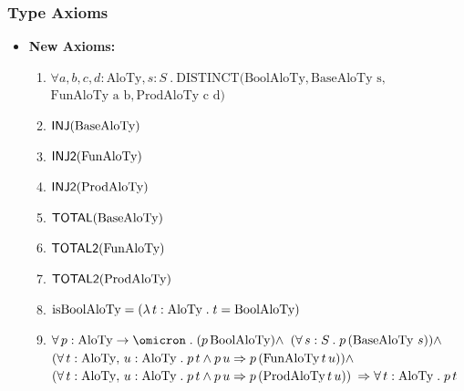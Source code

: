 \documentclass[xcolor={dvipsnames}]{beamer}
\newcommand{\cInjB}[1]{\mName{INJ2}(#1)}
\begin{document}
\begin{frame}[fragile]
\frametitle{Type Axioms}
\vspace{-2mm}
\begin{thyext}[Types]
\noindent
\begin{itemize} \setlength{\itemsep}{0pt}\setlength{\leftmargini}{0pt}\vspace{-0.5cm}
\item[]\hspace{-3ex}\textbf{New Axioms:}
\begin{enumerate}
\item<only@1>$\forall a, b, c, d: \text{AloTy}, s: S\ .\ \text{DISTINCT}(\text{BoolAloTy}, \text{BaseAloTy s},$ $\text{FunAloTy a b},\text{ProdAloTy c d})$

\item<only@1> $\mathsf{INJ}(\text{BaseAloTy})$

\item<only@1> $\cInjB{\text{FunAloTy}}$

\item<only@1> $\cInjB{\text{ProdAloTy}}$

\item<only@1> $\mathsf{TOTAL}(\text{BaseAloTy})$

\item<only@1> $\mathsf{TOTAL2}(\text{FunAloTy})$

\item<only@1> $\mathsf{TOTAL2}(\text{ProdAloTy})$

\item<only@1> $\text{isBoolAloTy} = (\lambda\, t : \text{AloTy} \mathrel{.} t = \text{BoolAloTy})$

\item<only@2> $\cForallX{p}{\cFunTyX{\text{AloTy}}{\cB}}{\cFunApp{p}
{\text{BoolAloTy}}} \land$
$\cForall{s}{S}{\cFunAppX{p} {(\text{BaseAloTy}\ s)}} \land$
$(\forall\, t : \text{AloTy},\, u : \text{AloTy} \mathrel{.} p\,t \land
p\,u \Rightarrow
p\,(\text{FunAloTy}\,t\,u)) \land$
$(\forall\, t : \text{AloTy},\, u : \text{AloTy} \mathrel{.} p\,t \land
p\,u \Rightarrow
p\,(\text{ProdAloTy}\,t\,u))$
$\Rightarrow \forall\, t : \text{AloTy} \mathrel{.} p\,t$
\end{enumerate}
\end{itemize}
\end{thyext}
\end{frame}
\end{document}
